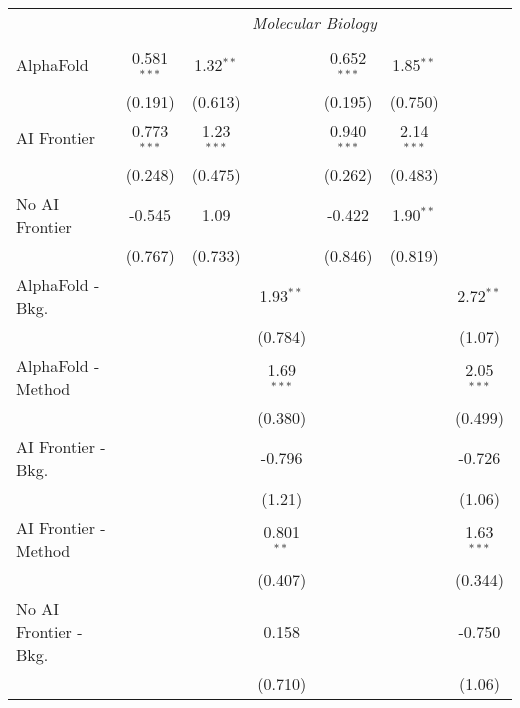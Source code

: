 \begin{tabular}{lcccccc}
 & \multicolumn{6}{c}{\textit{Molecular Biology}} \\ \\
   AlphaFold               & 0.581$^{***}$ & 1.32$^{**}$  &              & 0.652$^{***}$ & 1.85$^{**}$  &   \\   
                           & (0.191)       & (0.613)      &              & (0.195)       & (0.750)      &   \\   
   AI Frontier             & 0.773$^{***}$ & 1.23$^{***}$ &              & 0.940$^{***}$ & 2.14$^{***}$ &   \\   
                           & (0.248)       & (0.475)      &              & (0.262)       & (0.483)      &   \\   
   No AI Frontier          & -0.545        & 1.09         &              & -0.422        & 1.90$^{**}$  &   \\   
                           & (0.767)       & (0.733)      &              & (0.846)       & (0.819)      &   \\   
   AlphaFold - Bkg.        &               &              & 1.93$^{**}$  &               &              & 2.72$^{**}$\\   
                           &               &              & (0.784)      &               &              & (1.07)\\   
   AlphaFold - Method      &               &              & 1.69$^{***}$ &               &              & 2.05$^{***}$\\   
                           &               &              & (0.380)      &               &              & (0.499)\\   
   AI Frontier - Bkg.      &               &              & -0.796       &               &              & -0.726\\   
                           &               &              & (1.21)       &               &              & (1.06)\\   
   AI Frontier - Method    &               &              & 0.801$^{**}$ &               &              & 1.63$^{***}$\\   
                           &               &              & (0.407)      &               &              & (0.344)\\   
   No AI Frontier - Bkg.   &               &              & 0.158        &               &              & -0.750\\   
                           &               &              & (0.710)      &               &              & (1.06)\\   

\end{tabular}
